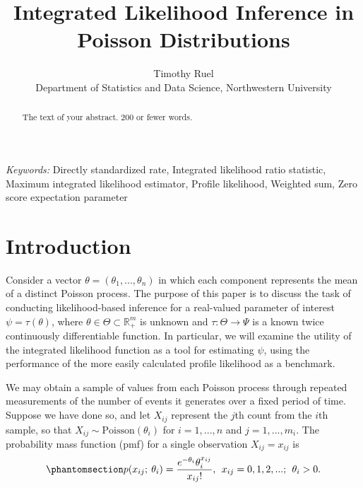 \documentclass[
  12pt]{article}
\begin{document}
\def\spacingset#1{\renewcommand{\baselinestretch}%
{#1}\small\normalsize} \spacingset{1}



\title{\bf Integrated Likelihood Inference in Poisson Distributions}
\author{
Timothy Ruel\\
Department of Statistics and Data Science, Northwestern University\\
}
\maketitle

\bigskip
\bigskip
\begin{abstract}
The text of your abstract. 200 or fewer words.
\end{abstract}

\noindent%
{\it Keywords:} Directly standardized rate, Integrated likelihood ratio
statistic, Maximum integrated likelihood estimator, Profile
likelihood, Weighted sum, Zero score expectation parameter
\vfill

\newpage
\spacingset{1.9} %

\section{Introduction}\label{sec-intro}

Consider a vector \(\theta = (\theta_1, ..., \theta_n)\) in which each
component represents the mean of a distinct Poisson process. The purpose
of this paper is to discuss the task of conducting likelihood-based
inference for a real-valued parameter of interest
\(\psi = \tau(\theta)\), where
\(\theta \in \Theta \subset \mathbb{R}^m_+\) is unknown and
\(\tau: \Theta \to \Psi\) is a known twice continuously differentiable
function. In particular, we will examine the utility of the integrated
likelihood function as a tool for estimating \(\psi\), using the
performance of the more easily calculated profile likelihood as a
benchmark.

We may obtain a sample of values from each Poisson process through
repeated measurements of the number of events it generates over a fixed
period of time. Suppose we have done so, and let \(X_{ij}\) represent
the \(j\)th count from the \(i\)th sample, so that
\(X_{ij} \sim \text{Poisson}(\theta_i)\) for \(i = 1, ..., n\) and
\(j = 1, ..., m_i.\) The probability mass function (pmf) for a single
observation \(X_{ij} = x_{ij}\) is
\begin{equation}\phantomsection\label{eq-1}{
p(x_{ij}; \> \theta_i) = \frac{e^{-\theta_i} \theta_i ^ {x_{ij}}}{x_{ij}!}, \> \> x_{ij} = 0, 1, 2, ... ; \> \> \theta_i > 0.
}\end{equation}
\end{document}
